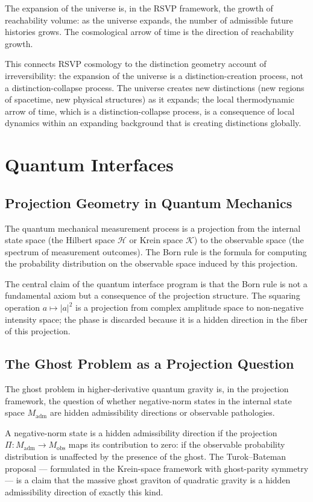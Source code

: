 \documentclass[12pt,a4paper]{book}
\theoremstyle{remark}
\theoremstyle{definition}
\begin{document}
The expansion of the universe is, in the RSVP framework, the growth of
reachability volume: as the universe expands, the number of admissible
future histories grows. The cosmological arrow of time is the direction
of reachability growth.

This connects RSVP cosmology to the distinction geometry account of
irreversibility: the expansion of the universe is a distinction-creation
process, not a distinction-collapse process. The universe creates new
distinctions (new regions of spacetime, new physical structures) as it
expands; the local thermodynamic arrow of time, which is a
distinction-collapse process, is a consequence of local dynamics within
an expanding background that is creating distinctions globally.

\chapter{Quantum Interfaces}

\section{Projection Geometry in Quantum Mechanics}

The quantum mechanical measurement process is a projection from the
internal state space (the Hilbert space $\mathcal{H}$ or Krein space
$\mathcal{K}$) to the observable space (the spectrum of measurement
outcomes). The Born rule is the formula for computing the probability
distribution on the observable space induced by this projection.

The central claim of the quantum interface program is that the Born rule
is not a fundamental axiom but a consequence of the projection structure.
The squaring operation $a \mapsto |a|^2$ is a projection from complex
amplitude space to non-negative intensity space; the phase is discarded
because it is a hidden direction in the fiber of this projection.

\section{The Ghost Problem as a Projection Question}

The ghost problem in higher-derivative quantum gravity is, in the
projection framework, the question of whether negative-norm states in
the internal state space $M_{\mathrm{adm}}$ are hidden admissibility
directions or observable pathologies.

A negative-norm state is a hidden admissibility direction if the
projection $\Pi : M_{\mathrm{adm}} \to M_{\mathrm{obs}}$ maps its
contribution to zero: if the observable probability distribution is
unaffected by the presence of the ghost. The Turok--Bateman proposal
--- formulated in the Krein-space framework with ghost-parity symmetry
--- is a claim that the massive ghost graviton of quadratic gravity is a
hidden admissibility direction of exactly this kind.
\end{document}

